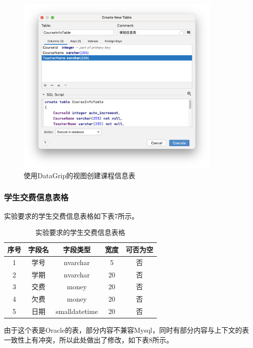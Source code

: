 \documentclass[a4paper,UTF8,heading=false,12pt]{article}
\begin{document}
    \begin{figure}[htbp]
        \centering
        \includegraphics[width=10cm]{../Images/CourseInfoTable.png}
        \caption{使用DataGrip的视图创建课程信息表}
    \end{figure}

    \subsubsection{学生交费信息表格}

    实验要求的学生交费信息表格如下表7所示。

    \begin{table}[htbp]
        \begin{center}
            \begin{tabular}{@{}ccccc@{}}
            \toprule
            序号 & 字段名  & 字段类型     & 宽度 & 可否为空 \\ \midrule
            1  & 学号   & nvarchar & 5 & 否    \\
            2  & 学期   & nvarchar & 20 & 否    \\
            3  & 交费   & money & 20 & 否    \\
            4  & 欠费   & money & 20 & 否    \\
            5  & 日期   & smalldatetime & 20 & 否    \\
            \bottomrule
            \end{tabular}
            \caption{实验要求的学生交费信息表格}
        \end{center}
    \end{table}

    由于这个表是Oracle的表，部分内容不兼容Mysql，同时有部分内容与上下文的表一致性上有冲突，所以此处做出了修改，如下表8所示。
\end{document}
